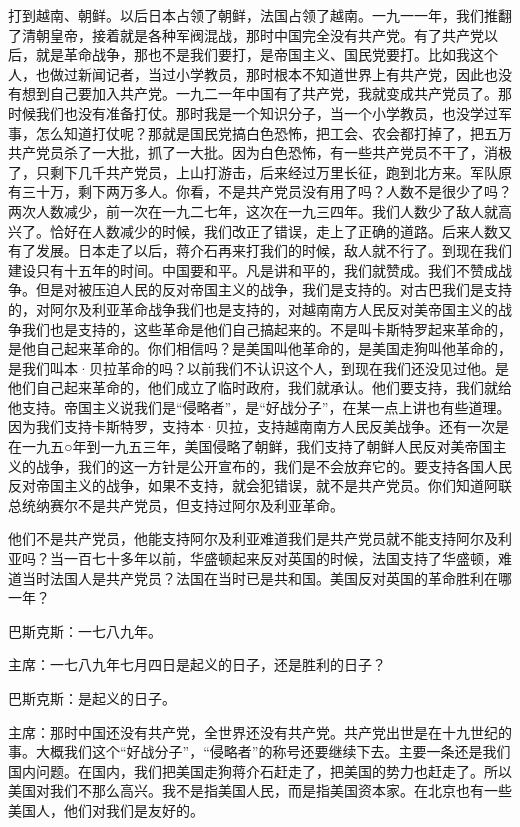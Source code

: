 打到越南、朝鲜。以后日本占领了朝鲜，法国占领了越南。一九一一年，我们推翻了清朝皇帝，接着就是各种军阀混战，那时中国完全没有共产党。有了共产党以后，就是革命战争，那也不是我们要打，是帝国主义、国民党要打。比如我这个人，也做过新闻记者，当过小学教员，那时根本不知道世界上有共产党，因此也没有想到自己要加入共产党。一九二一年中国有了共产党，我就变成共产党员了。那时候我们也没有准备打仗。那时我是一个知识分子，当一个小学教员，也没学过军事，怎么知道打仗呢？那就是国民党搞白色恐怖，把工会、农会都打掉了，把五万共产党员杀了一大批，抓了一大批。因为白色恐怖，有一些共产党员不干了，消极了，只剩下几千共产党员，上山打游击，后来经过万里长征，跑到北方来。军队原有三十万，剩下两万多人。你看，不是共产党员没有用了吗？人数不是很少了吗？两次人数减少，前一次在一九二七年，这次在一九三四年。我们人数少了敌人就高兴了。恰好在人数减少的时候，我们改正了错误，走上了正确的道路。后来人数又有了发展。日本走了以后，蒋介石再来打我们的时候，敌人就不行了。到现在我们建设只有十五年的时间。中国要和平。凡是讲和平的，我们就赞成。我们不赞成战争。但是对被压迫人民的反对帝国主义的战争，我们是支持的。对古巴我们是支持的，对阿尔及利亚革命战争我们也是支持的，对越南南方人民反对美帝国主义的战争我们也是支持的，这些革命是他们自己搞起来的。不是叫卡斯特罗起来革命的，是他自己起来革命的。你们相信吗？是美国叫他革命的，是美国走狗叫他革命的，是我们叫本·贝拉革命的吗？以前我们不认识这个人，到现在我们还没见过他。是他们自己起来革命的，他们成立了临时政府，我们就承认。他们要支持，我们就给他支持。帝国主义说我们是“侵略者”，是“好战分子”，在某一点上讲也有些道理。因为我们支持卡斯特罗，支持本·贝拉，支持越南南方人民反美战争。还有一次是在一九五○年到一九五三年，美国侵略了朝鲜，我们支持了朝鲜人民反对美帝国主义的战争，我们的这一方针是公开宣布的，我们是不会放弃它的。要支持各国人民反对帝国主义的战争，如果不支持，就会犯错误，就不是共产党员。你们知道阿联总统纳赛尔不是共产党员，但支持过阿尔及利亚革命。

他们不是共产党员，他能支持阿尔及利亚难道我们是共产党员就不能支持阿尔及利亚吗？当一百七十多年以前，华盛顿起来反对英国的时候，法国支持了华盛顿，难道当时法国人是共产党员？法国在当时已是共和国。美国反对英国的革命胜利在哪一年？

巴斯克斯：一七八九年。

主席：一七八九年七月四日是起义的日子，还是胜利的日子？

巴斯克斯：是起义的日子。

主席：那时中国还没有共产党，全世界还没有共产党。共产党出世是在十九世纪的事。大概我们这个“好战分子”，“侵略者”的称号还要继续下去。主要一条还是我们国内问题。在国内，我们把美国走狗蒋介石赶走了，把美国的势力也赶走了。所以美国对我们不那么高兴。我不是指美国人民，而是指美国资本家。在北京也有一些美国人，他们对我们是友好的。

